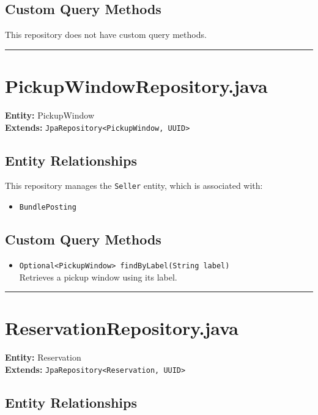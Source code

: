 \documentclass[12pt]{article}
\begin{document}
\subsection*{Custom Query Methods}
This repository does not have custom query methods.

\hrule
\vspace{1em}

\section{PickupWindowRepository.java}

\textbf{Entity:} PickupWindow \\
\textbf{Extends:} \texttt{JpaRepository<PickupWindow, UUID>}

\subsection*{Entity Relationships}

This repository manages the \texttt{Seller} entity, which is associated with:

\begin{itemize}
    \item \texttt{BundlePosting}
\end{itemize}


\subsection*{Custom Query Methods}
\begin{itemize}
    \item \texttt{Optional<PickupWindow> findByLabel(String label)} \\
Retrieves a pickup window using its label. 
\end{itemize}

\hrule
\vspace{1em}


\section{ReservationRepository.java}

\textbf{Entity:} Reservation \\
\textbf{Extends:} \texttt{JpaRepository<Reservation, UUID>}

\subsection*{Entity Relationships}
\end{document}
